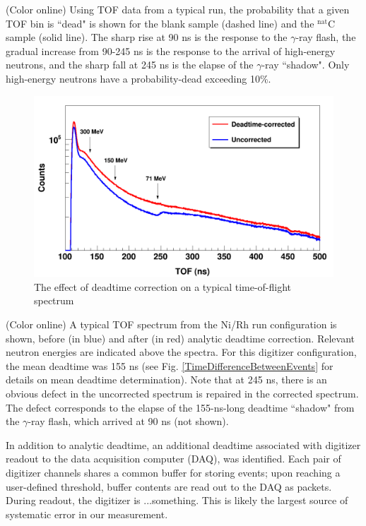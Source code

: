 (Color online) Using TOF data from a typical run, the probability that a given 
        TOF bin is ``dead" is shown for the blank sample (dashed line) and the $^{\text{nat}}$C   
        sample (solid line). The sharp rise at 90 ns is the response to the
        $\gamma$-ray flash, the gradual increase from 90-245 ns is the response to
        the arrival of high-energy neutrons, and the sharp fall at 245 ns
        is the elapse of the $\gamma$-ray ``shadow". Only high-energy neutrons
        have a probability-dead exceeding 10\%.

\begin{figure}
    \includegraphics[scale=0.3]{figures/CorrectionEffectOnTOF.png}
    \caption{The effect of deadtime correction on a typical time-of-flight spectrum}
    \label{CorrectionEffectOnTOF}
\end{figure}

(Color online) A typical TOF spectrum from the Ni/Rh
        run configuration is shown, before (in blue) and after (in red) analytic
        deadtime correction. Relevant neutron energies are indicated above the spectra.
        For this digitizer configuration, the mean deadtime was 155 ns (see Fig.
        \ref{TimeDifferenceBetweenEvents} for details on mean deadtime determination).
        Note that at 245 ns, there is an
        obvious defect in the uncorrected spectrum is repaired in the corrected
        spectrum. The defect
        corresponds to the elapse of the 155-ns-long deadtime ``shadow" from the $\gamma$-ray
        flash, which arrived at 90 ns (not shown).

In addition to analytic deadtime, an additional deadtime associated with digitizer readout 
to the data acquisition computer (DAQ), was identified. Each pair of
digitizer channels shares a common buffer for storing events; upon reaching a
user-defined threshold, buffer contents are read out to the DAQ as packets.
During readout, the digitizer is ...something.
This is likely the largest source of systematic error in our measurement.

